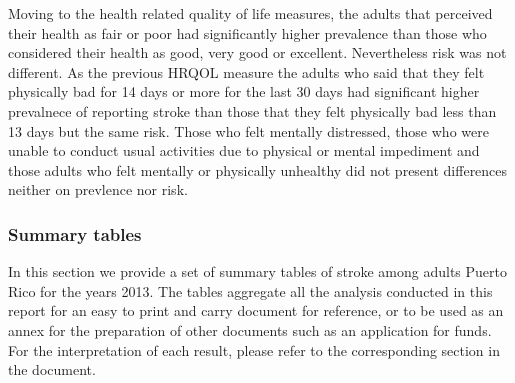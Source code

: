 Moving to the health related quality of life measures, the adults that perceived their health as fair or poor had significantly higher prevalence than those who considered their health as good, very good or excellent.  Nevertheless risk was not different. As the previous HRQOL measure the adults who said that they felt physically bad for 14 days or more for the last 30 days had significant higher prevalnece of reporting stroke than those that they felt physically bad less than 13 days but the same risk. Those who felt mentally distressed, those who were unable to conduct usual activities due to physical or mental impediment and those adults who felt mentally or physically unhealthy did not present differences neither on prevlence nor risk.


\newpage
\subsubsection{Summary tables}
In this section we provide a set of summary tables of stroke among adults Puerto Rico for the years 2013. The tables aggregate all the analysis conducted in this report for an easy to print and carry document for reference, or to be used as an annex for the preparation of other documents such as an application for funds. For the interpretation of each result, please refer to the corresponding section in the document.


